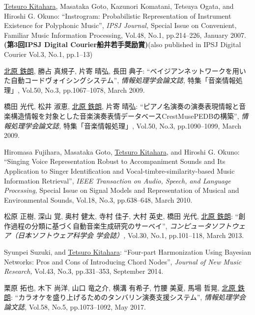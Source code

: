 \begin{Enumerate}
\item 
\underline{Tetsuro Kitahara}, 
Masataka Goto, 
Kazunori Komatani, 
Tetsuya
      Ogata, 
and 
Hiroshi
      G. Okuno: 
    ``Instrogram: Probabilistic Representation of Instrument Existence for Polyphonic Music'', 
    {\it IPSJ Journal,
    } Special Issue on Convenient, Familiar Music Information Processing, Vol.48, No.1, pp.214--226, January 2007. 
{\bf (第3回IPSJ Digital Courier船井若手奨励賞)}(also published in IPSJ Digital Courier Vol.3, No.1, pp.1--13)
\item 
\underline{北原 鉄朗}, 
勝占 真規子, 
片寄 晴弘, 
長田 典子: 
    ``ベイジアンネットワークを用いた自動コードヴォイシングシステム'', 
    {\it 情報処理学会論文誌,
    } 特集「音楽情報処理」, Vol.50, No.3, pp.1067--1078, March 2009. 

\item 
橋田 光代, 
松井 淑恵, 
\underline{北原 鉄朗}, 
片寄 晴弘: 
    ``ピアノ名演奏の演奏表現情報と音楽構造情報を対象とした音楽演奏表情データベースCrestMusePEDBの構築'', 
    {\it 情報処理学会論文誌,
    } 特集「音楽情報処理」, Vol.50, No.3, pp.1090--1099, March 2009. 

\item 
Hiromasa Fujihara, 
Masataka Goto, 
\underline{Tetsuro Kitahara}, 
and 
Hiroshi
      G. Okuno: 
    ``Singing Voice Representation Robust to Accompaniment Sounds and Its Application to Singer
      Identification and Vocal-timbre-similarity-based Music Information Retrieval'', 
    {\it IEEE Transaction on Audio, Speech, and Language Processing,
    } Special Issue on Signal Models and Representation of Musical and Environmental Sounds, Vol.18, No.3, pp.638--648, March 2010. 

\item 
松原 正樹, 
深山 覚, 
奥村 健太, 
寺村 佳子, 
大村 英史, 
橋田 光代, 
\underline{北原 鉄朗}: 
    ``創作過程の分類に基づく自動音楽生成研究のサーベイ'', 
    {\it コンピュータソフトウェア（日本ソフトウェア科学会 学会誌）,
    } Vol.30, No.1, pp.101--118, March 2013. 

\item 
Syunpei Suzuki, 
and 
\underline{Tetsuro Kitahara}: 
    ``Four-part Harmonization Using Bayesian Networks: Pros and Cons of Introducing Chord Nodes'', 
    {\it Journal of New Music Research,
    } Vol.43, No.3, pp.331--353, September 2014. 

\item 
栗原 拓也, 
木下 尚洋, 
山口 竜之介, 
横溝 有希子, 
竹腰 美夏, 
馬場 哲晃, 
\underline{北原 鉄朗}: 
    ``カラオケを盛り上げるためのタンバリン演奏支援システム'', 
    {\it 情報処理学会論文誌,
    } Vol.58, No.5, pp.1073--1092, May 2017. 


\end{Enumerate}
